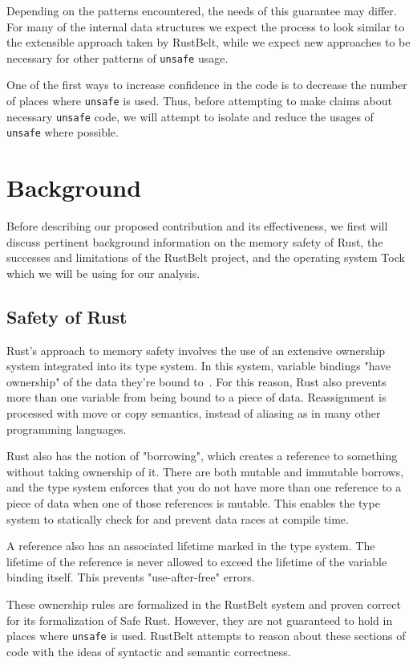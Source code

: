 \documentclass[12pt]{article}
\begin{document}
Depending on the patterns encountered, the needs of this guarantee may differ. For many of the internal data structures we expect the process to look similar to the extensible approach taken by RustBelt, while we expect new approaches to be necessary for other patterns of \texttt{unsafe} usage.

One of the first ways to increase confidence in the code is to decrease the number of places where \texttt{unsafe} is used. Thus, before attempting to make claims about necessary \texttt{unsafe} code, we will attempt to isolate and reduce the usages of \texttt{unsafe} where possible.

\section{Background}
Before describing our proposed contribution and its effectiveness, we first will discuss pertinent background information on the memory safety of Rust, the successes and limitations of the RustBelt project, and the operating system Tock~\cite{levy2017tock} which we will be using for our analysis.

\subsection{Safety of Rust}
Rust's approach to memory safety involves the use of an extensive ownership system integrated into its type system. In this system, variable bindings "have ownership" of the data they're bound to~\cite{rust_book}.
For this reason, Rust also prevents more than one variable from being bound to a piece of data. Reassignment is processed with move or copy semantics, instead of aliasing as in many other programming languages.

Rust also has the notion of "borrowing", which creates a reference to something without taking ownership of it. There are both mutable and immutable borrows, and the type system enforces that you do not have more than one reference to a piece of data when one of those references is mutable. This enables the type system to statically check for and prevent data races at compile time.

A reference also has an associated lifetime marked in the type system. The lifetime of the reference is never allowed to exceed the lifetime of the variable binding itself. This prevents "use-after-free" errors.

These ownership rules are formalized in the RustBelt system and proven correct for its formalization of Safe Rust. However, they are not guaranteed to hold in places where \texttt{unsafe} is used. RustBelt attempts to reason about these sections of code with the ideas of syntactic and semantic correctness.
\end{document}

